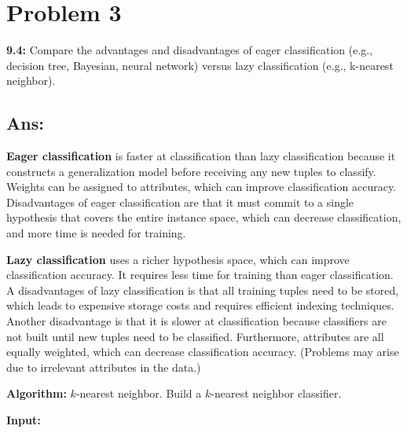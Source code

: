 \clearpage

\section*{Problem 3}
\textbf{9.4:} Compare the advantages and disadvantages of eager classification 
(e.g., decision tree, Bayesian, neural network) versus lazy classification 
(e.g., k-nearest neighbor).
\subsection*{Ans:}

\textbf{Eager classification} is faster at classification than lazy classification 
because it constructs a generalization model before receiving any new tuples to classify. 
Weights can be assigned to attributes, which can improve classification accuracy. 
Disadvantages of eager classification are that it must commit to a single hypothesis 
that covers the entire instance space, which can decrease classification, and more
time is needed for training.

\vspace{5ex}

\noindent \textbf{Lazy classification} uses a richer hypothesis space, which can improve classification 
accuracy. It requires less time for training than eager classification. A disadvantages 
of lazy classification is that all training tuples need to be stored, which leads to 
expensive storage costs and requires efficient indexing techniques. Another disadvantage 
is that it is slower at classification because classifiers are not built until new tuples 
need to be classified. Furthermore, attributes are all equally weighted, which can
decrease classification accuracy. (Problems may arise due to irrelevant attributes 
in the data.)

\vspace{5ex}

\noindent \textbf{Algorithm:} $k$-nearest neighbor. Build a $k$-nearest neighbor classifier.

\textbf{Input:}

